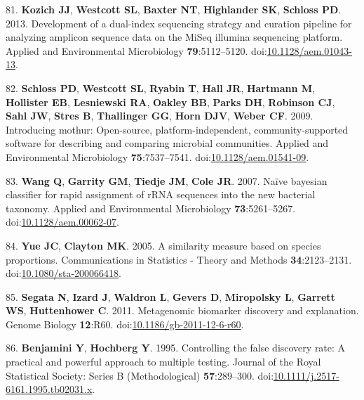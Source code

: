 \documentclass[
  12pt,
]{article}
\newenvironment{cslreferences}%
  {}%
  {\par}
\begin{document}
\begin{cslreferences}
\leavevmode\hypertarget{ref-Kozich2013}{}%
81. \textbf{Kozich JJ}, \textbf{Westcott SL}, \textbf{Baxter NT},
\textbf{Highlander SK}, \textbf{Schloss PD}. 2013. Development of a
dual-index sequencing strategy and curation pipeline for analyzing
amplicon sequence data on the MiSeq illumina sequencing platform.
Applied and Environmental Microbiology \textbf{79}:5112--5120.
doi:\href{https://doi.org/10.1128/aem.01043-13}{10.1128/aem.01043-13}.

\leavevmode\hypertarget{ref-Schloss2009}{}%
82. \textbf{Schloss PD}, \textbf{Westcott SL}, \textbf{Ryabin T},
\textbf{Hall JR}, \textbf{Hartmann M}, \textbf{Hollister EB},
\textbf{Lesniewski RA}, \textbf{Oakley BB}, \textbf{Parks DH},
\textbf{Robinson CJ}, \textbf{Sahl JW}, \textbf{Stres B},
\textbf{Thallinger GG}, \textbf{Horn DJV}, \textbf{Weber CF}. 2009.
Introducing mothur: Open-source, platform-independent,
community-supported software for describing and comparing microbial
communities. Applied and Environmental Microbiology
\textbf{75}:7537--7541.
doi:\href{https://doi.org/10.1128/aem.01541-09}{10.1128/aem.01541-09}.

\leavevmode\hypertarget{ref-Wang2007}{}%
83. \textbf{Wang Q}, \textbf{Garrity GM}, \textbf{Tiedje JM},
\textbf{Cole JR}. 2007. Naïve bayesian classifier for rapid assignment
of rRNA sequences into the new bacterial taxonomy. Applied and
Environmental Microbiology \textbf{73}:5261--5267.
doi:\href{https://doi.org/10.1128/aem.00062-07}{10.1128/aem.00062-07}.

\leavevmode\hypertarget{ref-Yue2005}{}%
84. \textbf{Yue JC}, \textbf{Clayton MK}. 2005. A similarity measure
based on species proportions. Communications in Statistics - Theory and
Methods \textbf{34}:2123--2131.
doi:\href{https://doi.org/10.1080/sta-200066418}{10.1080/sta-200066418}.

\leavevmode\hypertarget{ref-Segata2011}{}%
85. \textbf{Segata N}, \textbf{Izard J}, \textbf{Waldron L},
\textbf{Gevers D}, \textbf{Miropolsky L}, \textbf{Garrett WS},
\textbf{Huttenhower C}. 2011. Metagenomic biomarker discovery and
explanation. Genome Biology \textbf{12}:R60.
doi:\href{https://doi.org/10.1186/gb-2011-12-6-r60}{10.1186/gb-2011-12-6-r60}.

\leavevmode\hypertarget{ref-Benjamini1995}{}%
86. \textbf{Benjamini Y}, \textbf{Hochberg Y}. 1995. Controlling the
false discovery rate: A practical and powerful approach to multiple
testing. Journal of the Royal Statistical Society: Series B
(Methodological) \textbf{57}:289--300.
doi:\href{https://doi.org/10.1111/j.2517-6161.1995.tb02031.x}{10.1111/j.2517-6161.1995.tb02031.x}.


\end{cslreferences}
\end{document}
